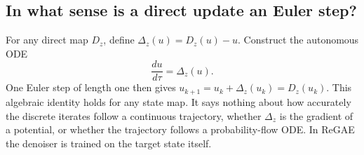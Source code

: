 \subsection{In what sense is a direct update an Euler step?}

For any direct map $D_z$, define $\Delta_z(u)=D_z(u)-u$. Construct the autonomous ODE
\begin{equation}
  \frac{du}{d\tau}=\Delta_z(u).
\end{equation}
One Euler step of length one then gives $u_{k+1}=u_k+\Delta_z(u_k)=D_z(u_k)$. This algebraic identity holds for any state map. It says nothing about how accurately the discrete iterates follow a continuous trajectory, whether $\Delta_z$ is the gradient of a potential, or whether the trajectory follows a probability-flow ODE. In ReGAE the denoiser is trained on the target state itself.
